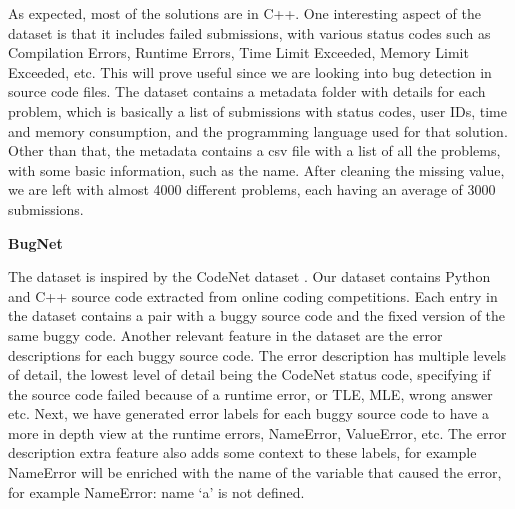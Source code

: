 \documentclass[12pt,a4paper]{report}
\begin{document}
As expected, most of the solutions are in C++. One interesting aspect of the dataset is that it includes failed submissions, with various status codes such as Compilation Errors, Runtime Errors, Time Limit Exceeded, Memory Limit Exceeded, etc. This will prove useful since we are looking into bug detection in source code files. The dataset contains a metadata folder with details for each problem, which is basically a list of submissions with status codes, user IDs, time and memory consumption, and the programming language used for that solution. Other than that, the metadata contains a csv file with a list of all the problems, with some basic information, such as the name. After cleaning the missing value, we are left with almost 4000 different problems, each having an average of 3000 submissions.

\textbf{BugNet}

The dataset is inspired by the CodeNet dataset \cite{puri2021codenet}. Our dataset contains Python and C++ source code extracted from online coding competitions. Each entry in the dataset contains a pair with a buggy source code and the fixed version of the same buggy code. Another relevant feature in the dataset are the error descriptions for each buggy source code. The error description has multiple levels of detail, the lowest level of detail being the CodeNet status code, specifying if the source code failed because of a runtime error, or TLE, MLE, wrong answer etc. Next, we have generated error labels for each buggy source code to have a more in depth view at the runtime errors, NameError, ValueError, etc. The error description extra feature also adds some context to these labels, for example NameError will be enriched with the name of the variable that caused the error, for example NameError: name ‘a’ is not defined. 
\end{document}

